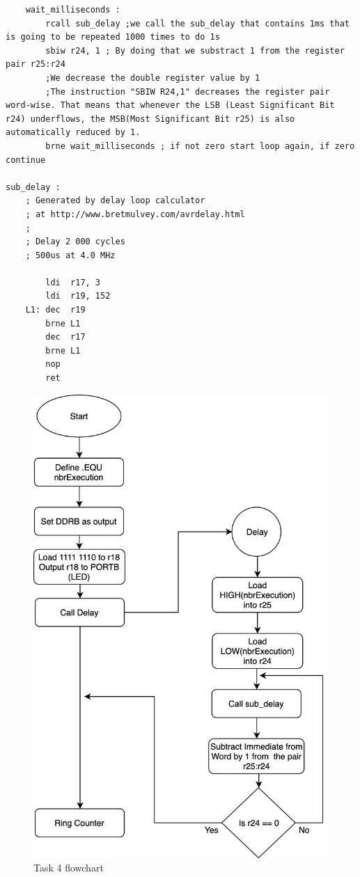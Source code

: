 \documentclass[a4paper,12pt]{article}
\begin{document}
\begin{lstlisting}
	wait_milliseconds :
		rcall sub_delay ;we call the sub_delay that contains 1ms that is going to be repeated 1000 times to do 1s
		sbiw r24, 1 ; By doing that we substract 1 from the register pair r25:r24
		;We decrease the double register value by 1
		;The instruction "SBIW R24,1" decreases the register pair word-wise. That means that whenever the LSB (Least Significant Bit r24) underflows, the MSB(Most Significant Bit r25) is also automatically reduced by 1.
		brne wait_milliseconds ; if not zero start loop again, if zero continue

sub_delay :
	; Generated by delay loop calculator
	; at http://www.bretmulvey.com/avrdelay.html
	;
	; Delay 2 000 cycles
	; 500us at 4.0 MHz

		ldi  r17, 3
		ldi  r19, 152
	L1: dec  r19
		brne L1
		dec  r17
		brne L1
		nop
		ret
\end{lstlisting}
\break
\begin{figure}
\begin{center}
\includegraphics[width=\textwidth/1 ]{flowchart/task4_flowchart.png}
\end{center}
\caption{Task 4 flowchart}
\label{task4}
\end{figure}

\break 



\end{document}
